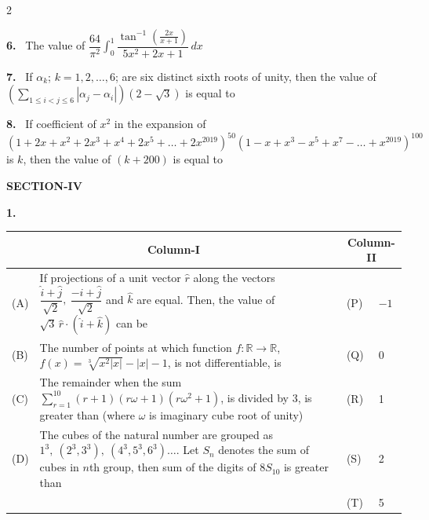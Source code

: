 \documentclass[10pt]{extarticle}
\newcommand{\sect}[1]{\par\smallskip\noindent\textbf{#1}\par}
\newcommand{\qn}[1]{\par\smallskip\noindent\textbf{#1.}~}
\begin{document}
\begin{multicols}{2}
\qn{6} The value of $\dfrac{64}{\pi^2}\displaystyle\int_0^1\dfrac{\tan^{-1}\!\left(\frac{2x}{x+1}\right)}{5x^2+2x+1}\,dx$

\qn{7} If $\alpha_k$; $k=1,2,\ldots,6$; are six distinct sixth roots of unity, then the value of $\left(\displaystyle\sum_{1\le i<j\le6}|\alpha_j-\alpha_i|\right)(2-\sqrt3)$ is equal to

\qn{8} If coefficient of $x^2$ in the expansion of $(1+2x+x^2+2x^3+x^4+2x^5+\ldots+2x^{2019})^{50}(1-x+x^3-x^5+x^7-\ldots+x^{2019})^{100}$ is $k$, then the value of $(k+200)$ is equal to

\sect{SECTION-IV}
\qn{1} 
\begin{center}\footnotesize
\begin{tabular}{|p{0.5cm}|p{5.0cm}|p{0.6cm}|p{0.7cm}|}
\hline
\multicolumn{2}{|c|}{Column-I} & \multicolumn{2}{c|}{Column-II}\\ \hline
(A) & If projections of a unit vector $\hat r$ along the vectors $\dfrac{\hat i+\hat j}{\sqrt2},\ \dfrac{-\hat i+\hat j}{\sqrt2}$ and $\hat k$ are equal. Then, the value of $\sqrt3\,\hat r\cdot(\hat i+\hat k)$ can be & (P) & $-1$\\ \hline
(B) & The number of points at which function $f:\mathbb R\to\mathbb R$, $f(x)=\sqrt[3]{x^2|x|}-|x|-1$, is not differentiable, is & (Q) & 0\\ \hline
(C) & The remainder when the sum $\displaystyle\sum_{r=1}^{10}(r+1)(r\omega+1)(r\omega^2+1)$, is divided by 3, is greater than (where $\omega$ is imaginary cube root of unity) & (R) & 1\\ \hline
(D) & The cubes of the natural number are grouped as $1^3,\ (2^3,3^3),\ (4^3,5^3,6^3)\ldots$. Let $S_n$ denotes the sum of cubes in $n$th group, then sum of the digits of $8S_{10}$ is greater than & (S) & 2\\ \hline
 & & (T) & 5\\ \hline
\end{tabular}
\end{center}


\end{multicols}
\end{document}
